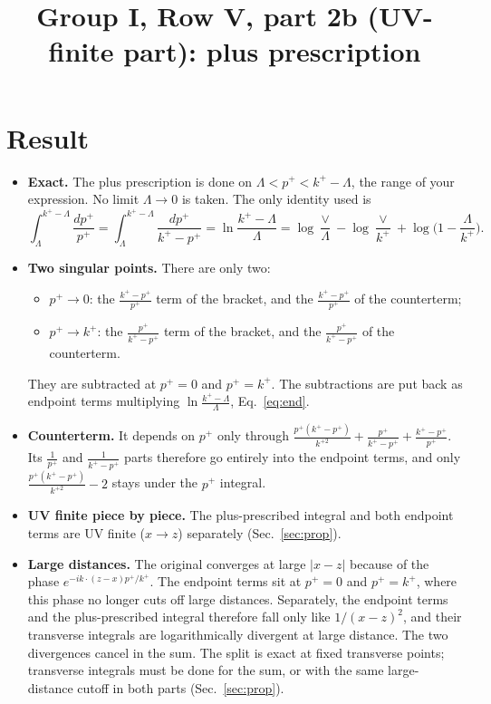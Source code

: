 \documentclass[10pt]{article}
\title{Group I, Row V, part 2b (UV-finite part): plus prescription}
\date{}
\begin{document}
\maketitle
\sloppy

\section{Result}
\begin{itemize}
\item \textbf{Exact.} The plus prescription is done on $\Lambda<p^+<k^+-\Lambda$, the range of your expression. No limit $\Lambda\to0$ is taken. The only identity used is
\begin{equation}
\int_{\Lambda}^{k^+-\Lambda}\frac{dp^+}{p^+}=\int_{\Lambda}^{k^+-\Lambda}\frac{dp^+}{k^+-p^+}=\ln\frac{k^+-\Lambda}{\Lambda}
=\log\frac{\vee}{\Lambda}-\log\frac{\vee}{k^+}+\log\Big(1-\frac{\Lambda}{k^+}\Big).
\label{eq:log}
\end{equation}
\item \textbf{Two singular points.} There are only two:
\begin{itemize}
\item $p^+\to0$: the $\frac{k^+-p^+}{p^+}$ term of the bracket, and the $\frac{k^+-p^+}{p^+}$ of the counterterm;
\item $p^+\to k^+$: the $\frac{p^+}{k^+-p^+}$ term of the bracket, and the $\frac{p^+}{k^+-p^+}$ of the counterterm.
\end{itemize}
They are subtracted at $p^+=0$ and $p^+=k^+$. The subtractions are put back as endpoint terms multiplying $\ln\frac{k^+-\Lambda}{\Lambda}$, Eq.~\eqref{eq:end}.
\item \textbf{Counterterm.} It depends on $p^+$ only through $\frac{p^+(k^+-p^+)}{k^{+2}}+\frac{p^+}{k^+-p^+}+\frac{k^+-p^+}{p^+}$. Its $\frac{1}{p^+}$ and $\frac{1}{k^+-p^+}$ parts therefore go entirely into the endpoint terms, and only $\frac{p^+(k^+-p^+)}{k^{+2}}-2$ stays under the $p^+$ integral.
\item \textbf{UV finite piece by piece.} The plus-prescribed integral and both endpoint terms are UV finite ($x\to z$) separately (Sec.~\ref{sec:prop}).
\item \textbf{Large distances.} The original converges at large $|x-z|$ because of the phase $e^{-ik\cdot(z-x)p^+/k^+}$. The endpoint terms sit at $p^+=0$ and $p^+=k^+$, where this phase no longer cuts off large distances. Separately, the endpoint terms and the plus-prescribed integral therefore fall only like $1/(x-z)^2$, and their transverse integrals are logarithmically divergent at large distance. The two divergences cancel in the sum. The split is exact at fixed transverse points; transverse integrals must be done for the sum, or with the same large-distance cutoff in both parts (Sec.~\ref{sec:prop}).

\end{itemize}
\end{document}
